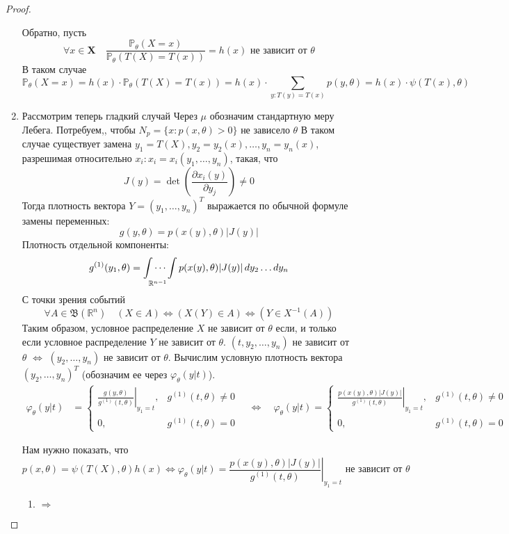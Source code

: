 \documentclass[12pt, russian]{article}
\begin{document}
\begin{proof}
\begin{enumerate}
\noindent Обратно, пусть 
$$ \forall x \in \mathbf{X} \quad \frac{\mathbb{P}_\theta(X = x)}{\mathbb{P}_\theta(T(X) = T(x))} = h(x) \text{ не зависит от }\theta $$
В таком случае
$$ \mathbb{P}_\theta(X = x) = h(x)\cdot\mathbb{P}_\theta(T(X) = T(x)) = h(x)\cdot\sum\limits_{y:T(y)=T(x)}{p(y, \theta)} = h(x)\cdot\psi(T(x), \theta) $$
\item Рассмотрим теперь гладкий случай
Через $\mu$ обозначим стандартную меру Лебега. Потребуем,, чтобы $N_p = \{x: p(x, \theta) > 0\}$ не зависело $\theta$
В таком случае существует замена $y_1 = T(X), y_2 = y_2(x),\ldots,y_n=y_n(x)$, разрешимая относительно $x_i:x_i = x_i(y_1,\ldots,y_n)$, такая, что 
$$ J(y) = \det{\left( \frac{\partial x_i(y)}{\partial y_j}\right)} \not= 0$$
Тогда плотность вектора $Y = (y_1,\ldots,y_n)^T$ выражается по обычной формуле замены переменных:
$$ g(y, \theta) = p(x(y), \theta) |J(y)|$$
Плотность отдельной компоненты:
$$ g^{(1)}(y_1, \theta) = \idotsint\limits_{\mathbb{R}^{n-1}}{p(x(y), \theta) |J(y)|\,dy_2\ldots dy_n}$$
С точки зрения событий
$$ \forall A \in \mathfrak{B}(\mathbb{R}^n)\quad (X\in A)\Leftrightarrow(X(Y) \in A)\Leftrightarrow(Y\in X^{-1}(A))$$
Таким образом, условное распределение $X$ не зависит от $\theta$ если, и только если условное распределение $Y$ не зависит от $\theta$. $(t,y_2,\ldots,y_n)$ не зависит от $\theta$ $\Leftrightarrow$ $(y_2,\ldots,y_n)$ не зависит от $\theta$. Вычислим условную плотность вектора $(y_2,\ldots,y_n)^T$ (обозначим ее через $\varphi_\theta(y|t)$).
\begin{equation*}
\begin{split}
\varphi_\theta(y|t)
&=\left\{
        \begin{array}{ll}
          \left.\frac{g(y, \theta)}{g^{(1)}(t, \theta)}\right|_{y_1 = t}, & g^{(1)}(t, \theta) \not= 0 \\
          0, & g^{(1)}(t, \theta)=0
        \end{array}
      \right. 
\quad\Longleftrightarrow \quad\varphi_\theta(y|t)=\left\{
        \begin{array}{ll}
          \left.\frac{p(x(y), \theta) |J(y)|}{g^{(1)}(t, \theta)}\right|_{y_1 = t}, & g^{(1)}(t, \theta) \not= 0 \\
          0, & g^{(1)}(t, \theta)=0
        \end{array}
      \right.
\end{split}
\end{equation*}

Нам нужно показать, что 
$$ p(x, \theta) = \psi(T(X), \theta)h(x) \Longleftrightarrow \varphi_\theta(y|t) = \left.\frac{p(x(y), \theta) |J(y)|}{g^{(1)}(t, \theta)}\right|_{y_1 = t} \text{  не зависит от } \theta$$
\begin{enumerate}
\item $\Rightarrow$


\end{enumerate}
\end{enumerate}
\end{proof}
\end{document}
